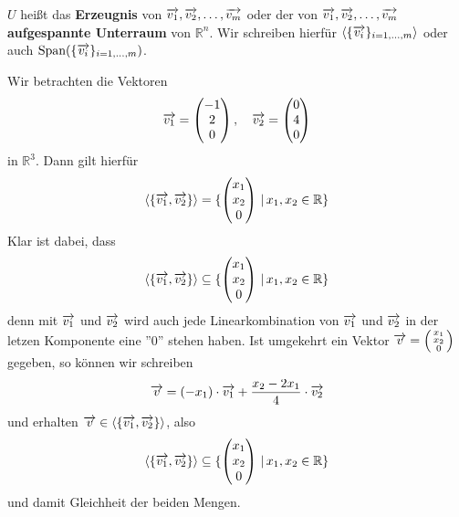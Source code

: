 \medbreak  

 $U$ heißt das \textbf{Erzeugnis} von $\overrightarrow{v_1}, \overrightarrow{v_2}, \ldots, \overrightarrow{v_m}$ 
oder der von $\overrightarrow{v_1}, \overrightarrow{v_2}, \ldots, \overrightarrow{v_m}$
\textbf{aufgespannte Unterraum} von $\mathbb R^n$. Wir 
schreiben hierfür $\langle \{ \overrightarrow{v_i} \}_{i = 1, \ldots, m} \rangle$ 
oder auch $\textrm{Span}( \{ \overrightarrow{v_i} \}_{i = 1, \ldots, m} )$.

\medbreak

\begin{beispiel} Wir betrachten die Vektoren 
  	$$ \overrightarrow{v_1} = \left( \begin{matrix} -1 \\ 2 \\ 0  \end{matrix} \right), \quad  
  	\overrightarrow{v_2} = \left( \begin{matrix} 0 \\ 4 \\ 0  \end{matrix} \right) $$
in $\mathbb R^3$. Dann gilt hierfür
  	$$ \langle \{ \overrightarrow{v_1}, \overrightarrow{v_2} \} \rangle = 
 	\{ \left( \begin{matrix} x_1 \\ x_2 \\ 0  \end{matrix} \right) \, \vert \, x_1, x_2 \in \mathbb R \} $$
Klar ist dabei, dass 
  	$$ \langle \{ \overrightarrow{v_1}, \overrightarrow{v_2} \} \rangle \subseteq 
    	\{ \left( \begin{matrix} x_1 \\ x_2 \\ 0  \end{matrix} \right) \, \vert \, x_1, x_2 \in \mathbb R \} $$
denn mit $\overrightarrow{v_1}$ und $\overrightarrow{v_2}$ wird auch jede 
Linearkombination von $\overrightarrow{v_1}$ und $\overrightarrow{v_2}$ in der 
letzen Komponente eine ''0'' stehen haben. Ist umgekehrt ein Vektor 
$\overrightarrow{v} = \left( \begin{smallmatrix} x_1 \\ x_2 \\ 0  \end{smallmatrix} 
\right)$ gegeben, so können wir schreiben 
  	$$ \overrightarrow{v} = (-x_1) \cdot \overrightarrow{v_1} + \frac {x_2-2x_1}{4} \cdot \overrightarrow{v_2} $$
und erhalten $\overrightarrow{v} \in \langle \{ \overrightarrow{v_1}, 
\overrightarrow{v_2} \} \rangle$, also 
  	$$ \langle \{ \overrightarrow{v_1}, \overrightarrow{v_2} \} \rangle \subseteq 
    	\{ \left( \begin{matrix} x_1 \\ x_2 \\ 0  \end{matrix} \right) \, \vert \, 
   	x_1, x_2 \in \mathbb R \} $$
und damit Gleichheit der beiden Mengen.
\end{beispiel}

